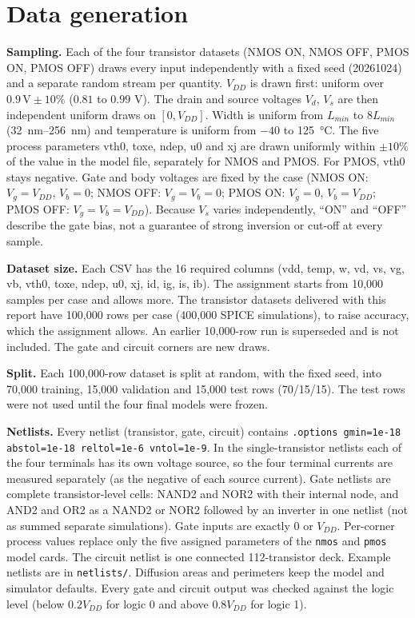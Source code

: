 \section{Data generation}
\label{sec:data}

\textbf{Sampling.} Each of the four transistor datasets (NMOS ON, NMOS OFF, PMOS ON, PMOS OFF) draws every input independently with a fixed seed (20261024) and a separate random stream per quantity. $V_{DD}$ is drawn first: uniform over $0.9\,\mathrm{V}\pm10\%$ ($0.81$ to $0.99$ V). The drain and source voltages $V_d$, $V_s$ are then independent uniform draws on $[0,V_{DD}]$. Width is uniform from $L_{min}$ to $8L_{min}$ (\SIrange{32}{256}{\nano\meter}) and temperature is uniform from $-40$ to \SI{125}{\celsius}. The five process parameters vth0, toxe, ndep, u0 and xj are drawn uniformly within $\pm10\%$ of the value in the model file, separately for NMOS and PMOS. For PMOS, vth0 stays negative. Gate and body voltages are fixed by the case (NMOS ON: $V_g=V_{DD}$, $V_b=0$; NMOS OFF: $V_g=V_b=0$; PMOS ON: $V_g=0$, $V_b=V_{DD}$; PMOS OFF: $V_g=V_b=V_{DD}$). Because $V_s$ varies independently, ``ON'' and ``OFF'' describe the gate bias, not a guarantee of strong inversion or cut-off at every sample.

\textbf{Dataset size.} Each CSV has the 16 required columns (vdd, temp, w, vd, vs, vg, vb, vth0, toxe, ndep, u0, xj, id, ig, is, ib). The assignment starts from 10,000 samples per case and allows more. The transistor datasets delivered with this report have 100,000 rows per case (400,000 SPICE simulations), to raise accuracy, which the assignment allows. An earlier 10,000-row run is superseded and is not included. The gate and circuit corners are new draws.

\textbf{Split.} Each 100,000-row dataset is split at random, with the fixed seed, into 70,000 training, 15,000 validation and 15,000 test rows (70/15/15). The test rows were not used until the four final models were frozen.

\textbf{Netlists.} Every netlist (transistor, gate, circuit) contains \texttt{.options gmin=1e-18 abstol=1e-18 reltol=1e-6 vntol=1e-9}. In the single-transistor netlists each of the four terminals has its own voltage source, so the four terminal currents are measured separately (as the negative of each source current). Gate netlists are complete transistor-level cells: NAND2 and NOR2 with their internal node, and AND2 and OR2 as a NAND2 or NOR2 followed by an inverter in one netlist (not as summed separate simulations). Gate inputs are exactly 0 or $V_{DD}$. Per-corner process values replace only the five assigned parameters of the \texttt{nmos} and \texttt{pmos} model cards. The circuit netlist is one connected 112-transistor deck. Example netlists are in \texttt{netlists/}. Diffusion areas and perimeters keep the model and simulator defaults. Every gate and circuit output was checked against the logic level (below $0.2V_{DD}$ for logic 0 and above $0.8V_{DD}$ for logic 1).

